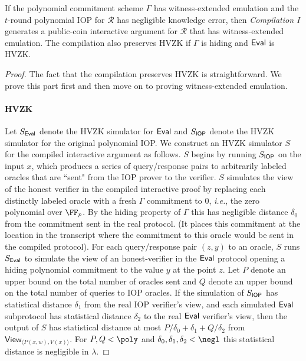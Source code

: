 \begin{lemma}\label{lem:IOPcompiler}
If the polynomial commitment scheme $\Gamma$ has witness-extended emulation and the $t$-round polynomial IOP for $\mathcal{R}$ has negligible knowledge error, then \emph{Compilation I} generates a public-coin interactive argument for $\mathcal{R}$ that has witness-extended emulation. The compilation also preserves HVZK if $\Gamma$ is hiding and $\textsf{{Eval}}$ is HVZK. 
\end{lemma}

\begin{proof}
The fact that the compilation preserves HVZK is straightforward. We prove this part first and then move on to proving witness-extended emulation. 

\paragraph{HVZK} Let $S_\textsf{{Eval}}$ denote the HVZK simulator for $\textsf{{Eval}}$ and $S_{\textsf{{IOP}}}$ denote the HVZK simulator for the original polynomial IOP. We construct an HVZK simulator $S$ for the compiled interactive argument as follows. 
$S$ begins by running $S_{\textsf{{IOP}}}$ on the input $x$, which produces a series of query/response pairs to arbitrarily labeled oracles that are ``sent" from the IOP prover to the verifier. $S$ simulates the view of the honest verifier in the compiled interactive proof by replacing each distinctly labeled oracle with a fresh $\Gamma$ commitment to $0$, \emph{i.e.}, the zero polynomial over $\FF_p$. By the hiding property of $\Gamma$ this has negligible distance $\delta_0$ from the commitment sent in the real protocol.
(It places this commitment at the location in the transcript where the commitment to this oracle would be sent in the compiled protocol).
 For each query/response pair $(z, y)$ to an oracle, $S$ runs $S_\textsf{{Eval}}$ to simulate the view of an honest-verifier in the $\textsf{{Eval}}$ protocol opening a hiding polynomial commitment to the value $y$ at the point $z$. Let $P$ denote an upper bound on the total number of oracles sent and $Q$ denote an upper bound on the total number of queries to IOP oracles. 
If the simulation of $S_{\textsf{{IOP}}}$ has statistical distance $\delta_1$ from the real IOP verifier's view, and each simulated $\textsf{{Eval}}$ subprotocol has statistical distance $\delta_2$ to the real $\textsf{{Eval}}$ verifier's view, then the output of $S$ has statistical distance at most $P/\delta_0 + \delta_1 + Q/\delta_2$ from $\textsf{View}_{\langle P(x, w), V(x) \rangle}$. For $P, Q < \poly$ and $\delta_0, \delta_1, \delta_2 < \negl$ this statistical distance is negligible in $\lambda$. 


\end{proof}
